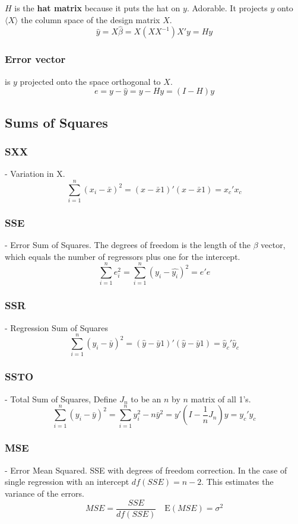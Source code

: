 \documentclass[12pt]{article}
\newcommand{\E}{\mathrm{E}}
\begin{document}
$H$ is the \textbf{hat matrix} because it puts the hat on $y$. Adorable. It projects
$y$ onto $\langle X \rangle$ the column space of the design matrix $X$.
\[
    \hat{y} = X \hat{\beta} = X(X X^{-1})X'y = Hy
\]

\subsubsection{Error vector} is $y$ projected onto the space orthogonal to $X$.
\[
    e = y - \hat{y} = y - Hy = (I - H)y
\]

\subsection{Sums of Squares}

\subsubsection{SXX} - Variation in X.
\[
    \sum_{i=1}^n (x_i - \bar{x})^2 
    = (x - \bar{x}1)' (x - \bar{x}1) 
    = x_c' x_c
\]

\subsubsection{SSE} - Error Sum of Squares. The degrees of freedom is the
length of the $\beta$ vector, which equals the number of regressors plus
one for the intercept.
\[
    \sum_{i=1}^n e_i^2 = \sum_{i=1}^n (y_i - \hat{y_i})^2
    = e'e
\]

\subsubsection{SSR} - Regression Sum of Squares
\[
    \sum_{i=1}^n (y_i - \bar{y})^2
    = (\hat{y} - \bar{y} 1)' (\hat{y} - \bar{y} 1) 
    = \hat{y}_c' \hat{y}_c
\]

\subsubsection{SSTO} - Total Sum of Squares, Define $J_n$ to be an $n$ by $n$ matrix of all 1's.
\[
    \sum_{i=1}^n (y_i - \bar{y})^2 = \sum_{i=1}^n y_i^2 - n\bar{y}^2
    = y'(I - \frac{1}{n} J_n)y
    = y_c' y_c
\]

\subsubsection{MSE} - Error Mean Squared. SSE with degrees of freedom correction. In the
case of single regression with an intercept $df(SSE) = n-2$. This estimates
the variance of the errors.
\[
    MSE = \frac{SSE}{df(SSE)} \quad \E(MSE) = \sigma^2
\]
\end{document}
